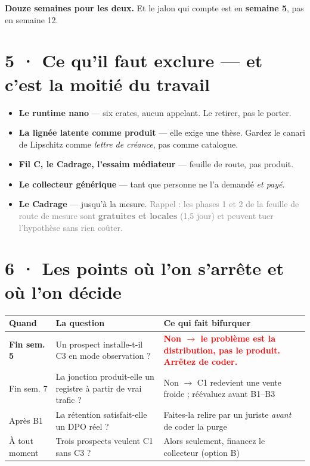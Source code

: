 \documentclass[10pt]{article}
\newcommand{\pire}[1]{\textcolor{red}{\textbf{#1}}}
\newcommand{\sz}[1]{\textcolor{grey}{\small\textsf{#1}}}
\newcommand{\fl}{$\rightarrow$}
\begin{document}
\textbf{Douze semaines pour les deux.} Et le jalon qui compte est en \textbf{semaine 5}, pas en
semaine 12.

\section{5 · Ce qu'il faut exclure --- et c'est la moitié du travail}

\begin{itemize}[leftmargin=1.2em,itemsep=2pt,topsep=2pt]
\item \textbf{Le runtime nano} --- six crates, aucun appelant. Le retirer, pas le porter.
\item \textbf{La lignée latente comme produit} --- elle exige une thèse. Gardez le canari de Lipschitz
      comme \emph{lettre de créance}, pas comme catalogue.
\item \textbf{Fil C, le Cadrage, l'essaim médiateur} --- feuille de route, pas produit.
\item \textbf{Le collecteur générique} --- tant que personne ne l'a demandé \emph{et payé}.
\item \textbf{Le Cadrage} --- jusqu'à la mesure. \sz{Rappel : les phases 1 et 2 de la feuille de route
      de mesure sont \textbf{gratuites et locales} (1,5 jour) et peuvent tuer l'hypothèse sans rien coûter.}
\end{itemize}

\section{6 · Les points où l'on s'arrête et où l'on décide}

\renewcommand{\arraystretch}{1.24}
\begin{center}\small
\begin{tabular}{@{}>{\raggedright\arraybackslash}p{2.6cm} >{\raggedright\arraybackslash}p{6.0cm} >{\raggedright\arraybackslash}p{7.0cm}@{}}
\toprule
\textbf{Quand} & \textbf{La question} & \textbf{Ce qui fait bifurquer} \\
\midrule
\textbf{Fin sem. 5} & Un prospect installe-t-il C3 en mode observation ? & \pire{Non \fl{} le problème est la distribution, pas le produit. Arrêtez de coder.} \\
Fin sem. 7 & La jonction produit-elle un registre à partir de vrai trafic ? & Non \fl{} C1 redevient une vente froide ; réévaluez avant B1--B3 \\
Après B1 & La rétention satisfait-elle un DPO réel ? & Faites-la relire par un juriste \emph{avant} de coder la purge \\
À tout moment & Trois prospects veulent C1 sans C3 ? & Alors seulement, financez le collecteur (option B) \\
\bottomrule
\end{tabular}
\end{center}
\end{document}
